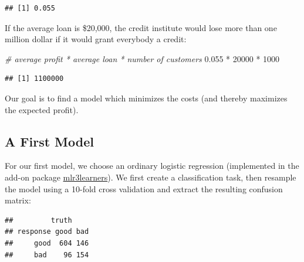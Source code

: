 \documentclass[
]{scrbook}
\newenvironment{Shaded}{\begin{snugshade}}{\end{snugshade}}
\newcommand{\CommentTok}[1]{\textcolor[rgb]{0.56,0.35,0.01}{\textit{#1}}}
\newcommand{\DecValTok}[1]{\textcolor[rgb]{0.00,0.00,0.81}{#1}}
\newcommand{\FloatTok}[1]{\textcolor[rgb]{0.00,0.00,0.81}{#1}}
\newcommand{\FunctionTok}[1]{\textcolor[rgb]{0.00,0.00,0.00}{#1}}
\newcommand{\NormalTok}[1]{#1}
\newcommand{\OtherTok}[1]{\textcolor[rgb]{0.56,0.35,0.01}{#1}}
\newcommand{\SpecialCharTok}[1]{\textcolor[rgb]{0.00,0.00,0.00}{#1}}
\newcommand{\StringTok}[1]{\textcolor[rgb]{0.31,0.60,0.02}{#1}}
\renewenvironment{Shaded} {\begin{snugshade}\small} {\end{snugshade}}
\begin{document}
\begin{verbatim}
## [1] 0.055
\end{verbatim}

If the average loan is \$20,000, the credit institute would lose more than one million dollar if it would grant everybody a credit:

\begin{Shaded}
\begin{Highlighting}[]
\CommentTok{\# average profit * average loan * number of customers}
\FloatTok{0.055} \SpecialCharTok{*} \DecValTok{20000} \SpecialCharTok{*} \DecValTok{1000}
\end{Highlighting}
\end{Shaded}

\begin{verbatim}
## [1] 1100000
\end{verbatim}

Our goal is to find a model which minimizes the costs (and thereby maximizes the expected profit).

\hypertarget{a-first-model}{%
\subsection{A First Model}\label{a-first-model}}

For our first model, we choose an ordinary logistic regression (implemented in the add-on package \href{https://mlr3learners.mlr-org.com}{mlr3learners}).
We first create a classification task, then resample the model using a 10-fold cross validation and extract the resulting confusion matrix:

\begin{Shaded}
\end{Shaded}

\begin{verbatim}
##         truth
## response good bad
##     good  604 146
##     bad    96 154
\end{verbatim}
\end{document}
